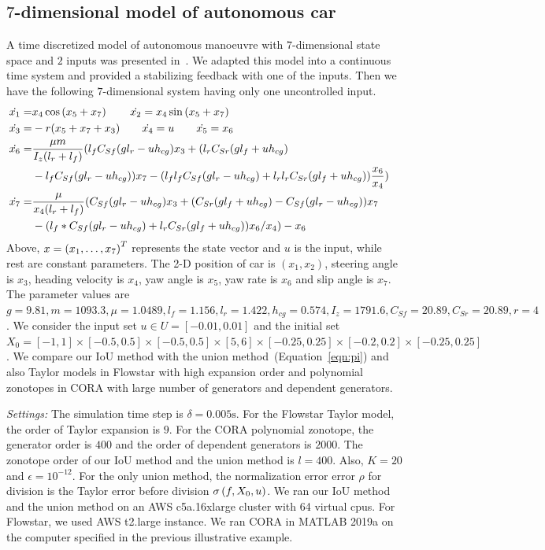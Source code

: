 \subsection{$7$-dimensional model of autonomous car}
A time discretized model of autonomous manoeuvre with $7$-dimensional
state space and $2$ inputs was presented in~\cite{lavaei2020formal}.
We adapted this model into a continuous time system and provided a
stabilizing feedback with one of the inputs.  Then we have the
following $7$-dimensional system having only one
uncontrolled input.
%
\begin{align*}
\dot{x_1}  = & x_4\cos\rb{x_5+x_7}\hspace{2em} \dot{x_2} =
x_4\sin\rb{x_5+x_7}\\
%
\dot{x_3}  = & -r(x_5+x_7+x_3) \hspace{2em} \dot{x_4} =
 u \hspace{2em} \dot{x_5} = x_6 & \\
 \dot{x_6}  = & \frac{\mu
 m}{I_z(l_r+l_f)}(l_fC_{Sf}(gl_r-uh_{cg})x_3+
 (l_rC_{Sr}(gl_f+uh_{cg})\\& -l_fC_{Sf}(gl_r-uh_{cg}))x_7
 -(l_fl_fC_{Sf}(gl_r-uh_{cg}) + l_rl_rC_{Sr}(gl_f+uh_{cg}))\frac{x_6}{x_4})\\
%
\dot{x_7} 
= & \frac{\mu}{x_4(l_r+l_f)}(C_{Sf}(gl_r-uh_{cg})x_3+(C_{Sr}(gl_f+uh_{cg})-C_{Sf}(gl_r-uh_{cg}))x_7\\
&-(l_f*C_{Sf}(gl_r-uh_{cg}) + l_rC_{Sr}(gl_f+uh_{cg}))x_6/x_4)-x_6
\end{align*}
%
Above, $x = \left(x_1,\ldots,x_7\right)^T$ represents the state vector and $u$
is the input, while rest are constant parameters.  The 2-D position of
car is $(x_1,x_2)$, steering angle is $x_3$, heading velocity is
$x_4$, yaw angle is $x_5$, yaw rate is $x_6$ and slip angle is $x_7$.
The parameter values are
%
$ g = 9.81, m = 1093.3, \mu = 1.0489, l_f = 1.156, l_r = 1.422, h_{cg}
  = 0.574, I_z = 1791.6, C_{Sf} = 20.89, C_{Sr} = 20.89, r = 4$ .  We
  consider the input set $u\in U = [-0.01,0.01]$ and the initial set
  $X_0 =
  [-1,1]\times[-0.5,0.5]\times[-0.5,0.5]\times[5,6]\times[-0.25,0.25]\times[-0.2,0.2]\times[-0.25,0.25]$.
  We compare our IoU method with the union
  method~(Equation~\ref{eqn:pi}) and also Taylor models in Flowstar
  with high expansion order and polynomial zonotopes in CORA with
  large number of generators and dependent generators.

\emph{Settings:}  The simulation time step is $\delta = 0.005\si{\second}$.  
For the Flowstar Taylor model, the order of Taylor expansion is $9$.  
For the CORA polynomial zonotope, the generator order is $400$ and the order of dependent generators is $2000$.  
The zonotope order of our IoU method and the union method is $l=400$.  
Also, $K = 20$ and $\epsilon = 10^{-12}$.  
For the only union method, the normalization error
  error $\rho$ for division is the Taylor error before division
  $\sigma\left(f,X_0,u\right)$.  We ran our IoU method and the union method on
  an AWS c5a.16xlarge cluster with 64 virtual cpus.  For Flowstar, we
  used AWS t2.large instance.  We ran CORA in MATLAB 2019a on the
  computer specified in the previous illustrative example.

